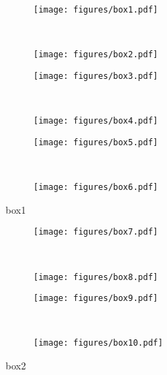 \begin{figure}
	\centering
	\begin{subfigure}[t]{0.48\textwidth}
		\texttt{[image: figures/box1.pdf]}
	\end{subfigure}
	~
	\begin{subfigure}[t]{0.48\textwidth}
		\texttt{[image: figures/box2.pdf]}
	\end{subfigure}
	
	\begin{subfigure}[t]{0.48\textwidth}
		\texttt{[image: figures/box3.pdf]}
	\end{subfigure}
	~
	\begin{subfigure}[t]{0.48\textwidth}
		\texttt{[image: figures/box4.pdf]}
	\end{subfigure}
	
	\begin{subfigure}[t]{0.48\textwidth}
		\texttt{[image: figures/box5.pdf]}
	\end{subfigure}
	~
	\begin{subfigure}[t]{0.48\textwidth}
		\texttt{[image: figures/box6.pdf]}
	\end{subfigure}
	\caption{box1}
	\label{}
\end{figure}

\begin{figure}
	\centering
	\begin{subfigure}[t]{0.48\textwidth}
		\texttt{[image: figures/box7.pdf]}
	\end{subfigure}
	~
	\begin{subfigure}[t]{0.48\textwidth}
		\texttt{[image: figures/box8.pdf]}
	\end{subfigure}
	
	\begin{subfigure}[t]{0.48\textwidth}
		\texttt{[image: figures/box9.pdf]}
	\end{subfigure}
	~
	\begin{subfigure}[t]{0.48\textwidth}
		\texttt{[image: figures/box10.pdf]}
	\end{subfigure}
	\caption{box2}
	\label{}
\end{figure}